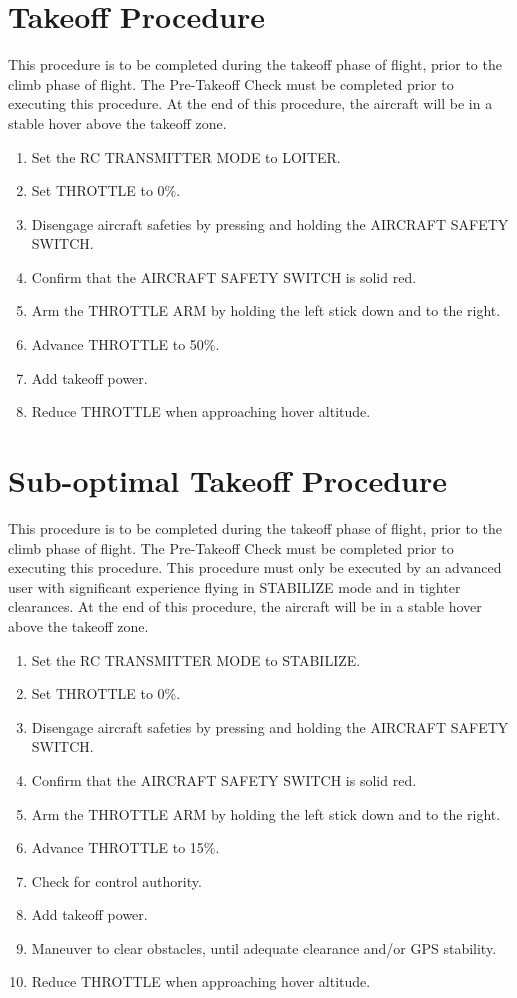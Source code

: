 \documentclass{report}
\begin{document}
	\section{Takeoff Procedure}
		This procedure is to be completed during the takeoff phase of flight, prior to the climb phase of flight.  The Pre-Takeoff Check must be completed prior to executing this procedure.  At the end of this procedure, the aircraft will be in a stable hover above the takeoff zone.
		\begin{enumerate}
			\item Set the RC TRANSMITTER MODE to LOITER.
			\item Set THROTTLE to 0\%.
			\item Disengage aircraft safeties by pressing and holding the AIRCRAFT SAFETY SWITCH.
			\item Confirm that the AIRCRAFT SAFETY SWITCH is solid red.
			\item Arm the THROTTLE ARM by holding the left stick down and to the right.
			\item Advance THROTTLE to 50\%.
			\item Add takeoff power.
			\item Reduce THROTTLE when approaching hover altitude.
		\end{enumerate}
	\section{Sub-optimal Takeoff Procedure}
		This procedure is to be completed during the takeoff phase of flight, prior to the climb phase of flight.  The Pre-Takeoff Check must be completed prior to executing this procedure.  This procedure must only be executed by an advanced user with significant experience flying in STABILIZE mode and in tighter clearances.  At the end of this procedure, the aircraft will be in a stable hover above the takeoff zone.
		\begin{enumerate}
			\item Set the RC TRANSMITTER MODE to STABILIZE.
			\item Set THROTTLE to 0\%.
			\item Disengage aircraft safeties by pressing and holding the AIRCRAFT SAFETY SWITCH.
			\item Confirm that the AIRCRAFT SAFETY SWITCH is solid red.
			\item Arm the THROTTLE ARM by holding the left stick down and to the right.
			\item Advance THROTTLE to 15\%.
			\item Check for control authority.
			\item Add takeoff power.
			\item Maneuver to clear obstacles, until adequate clearance and/or GPS stability.
			\item Reduce THROTTLE when approaching hover altitude.
		\end{enumerate}
\end{document}
